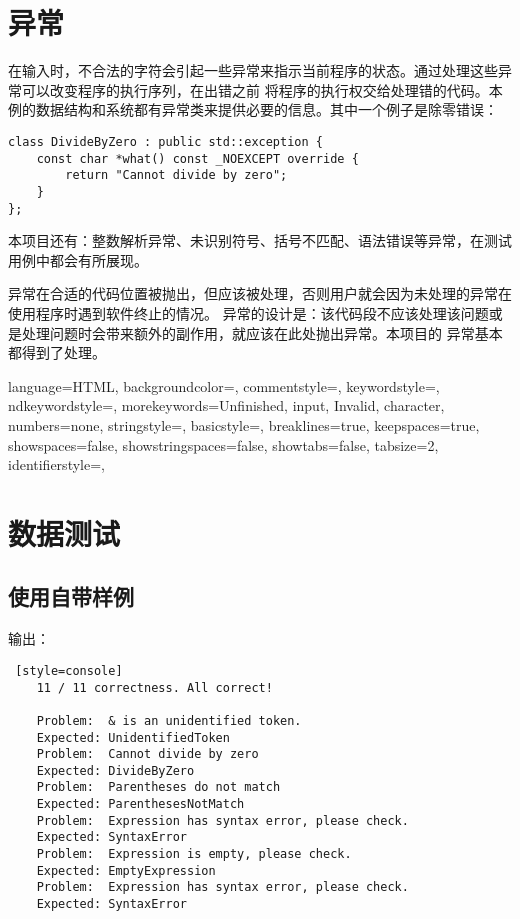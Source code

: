 
\chapter{异常}
在输入时，不合法的字符会引起一些异常来指示当前程序的状态。通过处理这些异常可以改变程序的执行序列，在出错之前%
将程序的执行权交给处理错的代码。本例的数据结构和系统都有异常类来提供必要的信息。其中一个例子是除零错误：
\begin{lstlisting}[firstnumber=244, caption=HashTableException 异常类]
class DivideByZero : public std::exception {
    const char *what() const _NOEXCEPT override {
        return "Cannot divide by zero";
    }
};
\end{lstlisting}

本项目还有：整数解析异常、未识别符号、括号不匹配、语法错误等异常，在测试用例中都会有所展现。

异常在合适的代码位置被抛出，但应该被处理，否则用户就会因为未处理的异常在使用程序时遇到软件终止的情况。%
异常的设计是：该代码段不应该处理该问题或是处理问题时会带来额外的副作用，就应该在此处抛出异常。本项目的%
异常基本都得到了处理。


 {
    language=HTML,
    backgroundcolor=\color{CPPDark},   
    commentstyle=\color{CPPLight},
    keywordstyle=\color{red},
    ndkeywordstyle={},
    morekeywords={Unfinished, input, Invalid, character},
    numbers=none,
    stringstyle={},
    basicstyle=\fira\color{white}\footnotesize,
    breaklines=true,                                     
    keepspaces=true,                                     
    showspaces=false,                
    showstringspaces=false,
    showtabs=false,                  
    tabsize=2,
    identifierstyle={},
}

\chapter{数据测试}

\section{使用自带样例}
输出：
\begin{lstlisting} [style=console]
    11 / 11 correctness. All correct!

    Problem:  & is an unidentified token.
    Expected: UnidentifiedToken
    Problem:  Cannot divide by zero
    Expected: DivideByZero
    Problem:  Parentheses do not match
    Expected: ParenthesesNotMatch
    Problem:  Expression has syntax error, please check.
    Expected: SyntaxError
    Problem:  Expression is empty, please check.
    Expected: EmptyExpression
    Problem:  Expression has syntax error, please check.
    Expected: SyntaxError
\end{lstlisting}

